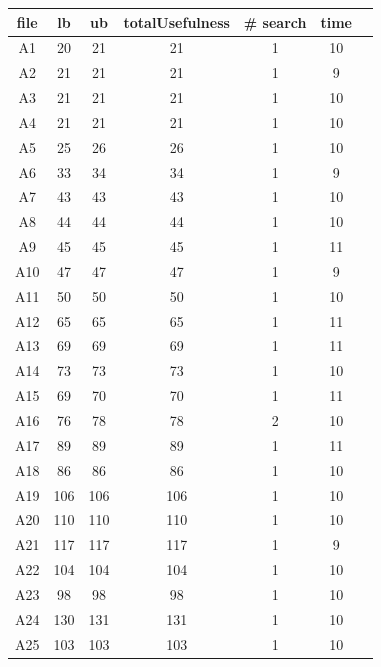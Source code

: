 \documentclass[a4paper ,12pt,french]{article}
\begin{document}
\begin{figure}[!h]
\begin{tabular}{|c|c|c|c|c|c|c|}
\hline
file&lb&ub&totalUsefulness&\# search&time\\
\hline
\hline
A1&20&21&21&1&10\\ \hline
A2&21&21&21&1&9\\ \hline
A3&21&21&21&1&10\\ \hline
A4&21&21&21&1&10\\ \hline
A5&25&26&26&1&10\\ \hline
A6&33&34&34&1&9\\ \hline
A7&43&43&43&1&10\\ \hline
A8&44&44&44&1&10\\ \hline
A9&45&45&45&1&11\\ \hline
A10&47&47&47&1&9\\ \hline
A11&50&50&50&1&10\\ \hline
A12&65&65&65&1&11\\ \hline
A13&69&69&69&1&11\\ \hline
A14&73&73&73&1&10\\ \hline
A15&69&70&70&1&11\\ \hline
A16&76&78&78&2&10\\ \hline
A17&89&89&89&1&11\\ \hline
A18&86&86&86&1&10\\ \hline
A19&106&106&106&1&10\\ \hline
A20&110&110&110&1&10\\ \hline
A21&117&117&117&1&9\\ \hline
A22&104&104&104&1&10\\ \hline
A23&98&98&98&1&10\\ \hline
A24&130&131&131&1&10\\ \hline
A25&103&103&103&1&10\\ \hline
\end{tabular}
\end{figure}
\end{document}
